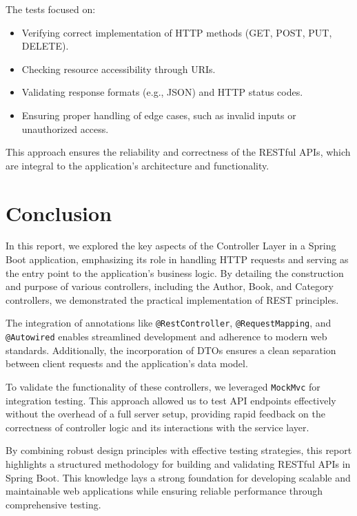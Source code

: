 \documentclass[a4paper,12pt]{article}
\begin{document}
The tests focused on:
\begin{itemize}
    \item Verifying correct implementation of HTTP methods (GET, POST, PUT, DELETE).
    \item Checking resource accessibility through URIs.
    \item Validating response formats (e.g., JSON) and HTTP status codes.
    \item Ensuring proper handling of edge cases, such as invalid inputs or unauthorized access.
\end{itemize}

This approach ensures the reliability and correctness of the RESTful APIs, which are integral to the application's architecture and functionality.


\section{Conclusion}
In this report, we explored the key aspects of the Controller Layer in a Spring Boot application, emphasizing its role in handling HTTP requests and serving as the entry point to the application’s business logic. By detailing the construction and purpose of various controllers, including the Author, Book, and Category controllers, we demonstrated the practical implementation of REST principles. 

The integration of annotations like \texttt{@RestController}, \texttt{@RequestMapping}, and \texttt{@Autowired} enables streamlined development and adherence to modern web standards. Additionally, the incorporation of DTOs ensures a clean separation between client requests and the application’s data model.

To validate the functionality of these controllers, we leveraged \texttt{MockMvc} for integration testing. This approach allowed us to test API endpoints effectively without the overhead of a full server setup, providing rapid feedback on the correctness of controller logic and its interactions with the service layer.

By combining robust design principles with effective testing strategies, this report highlights a structured methodology for building and validating RESTful APIs in Spring Boot. This knowledge lays a strong foundation for developing scalable and maintainable web applications while ensuring reliable performance through comprehensive testing.
\end{document}

